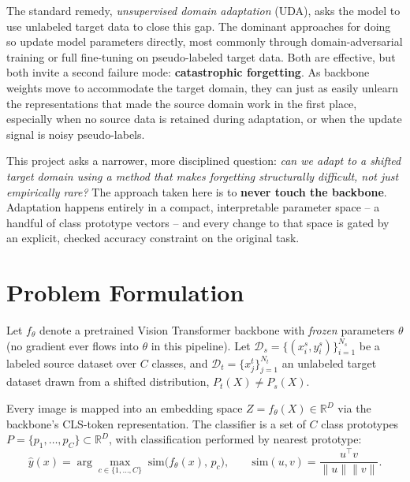 \documentclass[11pt]{article}
\begin{document}
The standard remedy, \emph{unsupervised domain adaptation} (UDA), asks the model to use unlabeled
target data to close this gap. The dominant approaches for doing so update model parameters
directly, most commonly through domain-adversarial training or full fine-tuning on
pseudo-labeled target data. Both are effective, but both invite a second failure mode:
\textbf{catastrophic forgetting}. As backbone weights move to accommodate the target domain, they
can just as easily unlearn the representations that made the source domain work in the first
place, especially when no source data is retained during adaptation, or when the update signal
is noisy pseudo-labels.

This project asks a narrower, more disciplined question: \emph{can we adapt to a shifted target
domain using a method that makes forgetting structurally difficult, not just empirically rare?}
The approach taken here is to \textbf{never touch the backbone}. Adaptation happens entirely in a
compact, interpretable parameter space -- a handful of class prototype vectors -- and every
change to that space is gated by an explicit, checked accuracy constraint on the original task.

\section{Problem Formulation}

Let $f_\theta$ denote a pretrained Vision Transformer backbone with \emph{frozen} parameters
$\theta$ (no gradient ever flows into $\theta$ in this pipeline). Let
$\mathcal{D}_s = \{(x_i^s, y_i^s)\}_{i=1}^{N_s}$ be a labeled source dataset over $C$ classes, and
$\mathcal{D}_t = \{x_j^t\}_{j=1}^{N_t}$ an unlabeled target dataset drawn from a shifted
distribution, $P_t(X) \neq P_s(X)$.

Every image is mapped into an embedding space $Z = f_\theta(X) \in \mathbb{R}^D$ via the
backbone's CLS-token representation. The classifier is a set of $C$ class prototypes
$P = \{p_1, \dots, p_C\} \subset \mathbb{R}^D$, with classification performed by nearest
prototype:
\begin{equation}
\hat{y}(x) = \arg\max_{c \in \{1,\dots,C\}} \; \mathrm{sim}\big(f_\theta(x),\, p_c\big),
\qquad
\mathrm{sim}(u, v) = \frac{u^\top v}{\lVert u \rVert \lVert v \rVert}.
\end{equation}
\end{document}
